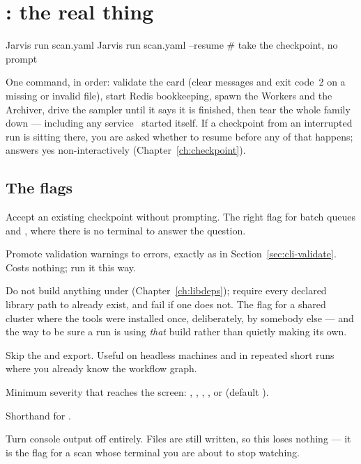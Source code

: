 \section{: the real thing}
\label{sec:cli-run}

\begin{terminal}
\begin{jcmd}
Jarvis run scan.yaml
Jarvis run scan.yaml --resume    # take the checkpoint, no prompt
\end{jcmd}
\end{terminal}

One command, in order: validate the card (clear messages and exit code~2 on a missing or
invalid file), start Redis bookkeeping, spawn the Workers and the Archiver, drive the
sampler until it says it is finished, then tear the whole family down --- including any
 service \Jtwo\ started itself. If a checkpoint from an
interrupted run is sitting there, you are asked whether to resume before any of that
happens;  answers yes non-interactively
(Chapter~\ref{ch:checkpoint}).

\subsection{The flags}

\begin{keylist}
  \item[--resume] Accept an existing checkpoint without prompting. The right flag for
        batch queues and , where there is no terminal to answer the question.
  \item[--strict] Promote validation warnings to errors, exactly as in
        Section~\ref{sec:cli-validate}. Costs nothing; run it this way.
  \item[--skip-library-installation] Do not build anything under 
        (Chapter~\ref{ch:libdeps}); require every declared library path to already
        exist, and fail if one does not. The flag for a shared cluster where the tools
        were installed once, deliberately, by somebody else --- and the way to be sure a
        run is using \emph{that} build rather than quietly making its own.
  \item[--skip-draw-flowchart] Skip the  and 
        export. Useful on headless machines and in repeated short runs where you already
        know the workflow graph.
  \item[--console-level LEVEL] Minimum severity that reaches the screen: ,
        , , , or  (default
        ).
  \item[--debug, -d] Shorthand for .
  \item[--silence, -s] Turn console output off entirely. Files are still written, so this
        loses nothing --- it is the flag for a scan whose terminal you are about to stop
        watching.
\end{keylist}

